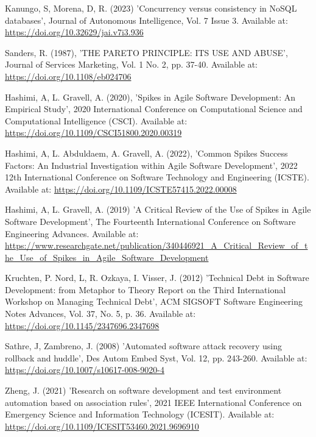 \noindent Kanungo, S, Morena, D, R. (2023) 'Concurrency versus consistency in NoSQL databases', Journal of Autonomous Intelligence, Vol. 7 Issue 3. Available at: \url{https://doi.org/10.32629/jai.v7i3.936}
\vspace{0.2cm}

\noindent Sanders, R. (1987), 'THE PARETO PRINCIPLE: ITS USE AND ABUSE', Journal of Services Marketing, Vol. 1 No. 2, pp. 37-40. Available at: \url{https://doi.org/10.1108/eb024706}
\vspace{0.2cm}

\noindent Hashimi, A, L. Gravell, A. (2020), 'Spikes in Agile Software Development: An Empirical Study', 2020 International Conference on Computational Science and Computational Intelligence (CSCI). Available at: \url{https://doi.org/10.1109/CSCI51800.2020.00319}
\vspace{0.2cm}

\noindent Hashimi, A, L. Abduldaem, A. Gravell, A. (2022), 'Common Spikes Success Factors: An Industrial Investigation within Agile Software Development', 2022 12th International Conference on Software Technology and Engineering (ICSTE). Available at: \url{https://doi.org/10.1109/ICSTE57415.2022.00008}
\vspace{0.2cm}

\noindent Hashimi, A, L. Gravell, A. (2019) 'A Critical Review of the Use of Spikes in Agile Software Development', The Fourteenth International Conference on Software Engineering Advances. Available at: \url{https://www.researchgate.net/publication/340446921_A_Critical_Review_of_the_Use_of_Spikes_in_Agile_Software_Development}
\vspace{0.2cm}

\noindent Kruchten, P. Nord, L, R. Ozkaya, I. Visser, J. (2012) 'Technical Debt in Software Development: from Metaphor to Theory Report on the Third International Workshop on Managing Technical Debt', ACM SIGSOFT Software Engineering Notes Advances, Vol. 37, No. 5, p. 36. Available at: \url{https://doi.org/10.1145/2347696.2347698}
\vspace{0.2cm}

\noindent Sathre, J, Zambreno, J. (2008) 'Automated software attack recovery using rollback and huddle', Des Autom Embed Syst, Vol. 12, pp. 243-260. Available at: \url{https://doi.org/10.1007/s10617-008-9020-4}
\vspace{0.2cm}

\noindent Zheng, J. (2021) 'Research on software development and test environment automation based on association rules', 2021 IEEE International Conference on Emergency Science and Information Technology (ICESIT). Available at: \url{https://doi.org/10.1109/ICESIT53460.2021.9696910}
\vspace{0.2cm}

